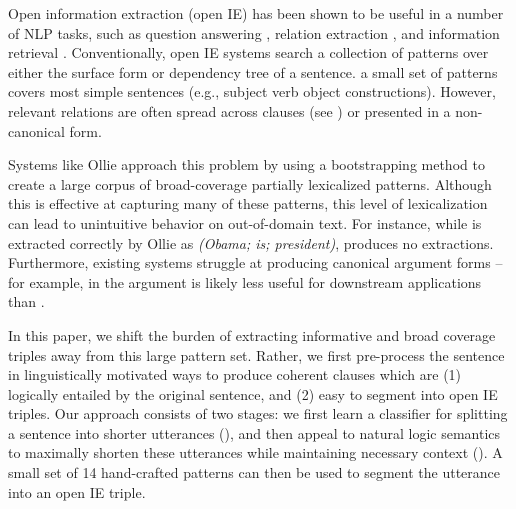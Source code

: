 Open information extraction (open IE) has been shown to be useful in a
  number of NLP tasks, such as question answering \cite{key:2014fader-openqa},
  relation extraction \cite{key:2010soderland-adapting}, 
  and information retrieval \cite{key:2011etzioni-nature}.
Conventionally, open IE systems search a collection of patterns over either
  the surface form or dependency tree of a sentence.
a small set of patterns covers most simple sentences (e.g., subject verb
  object constructions).
However, relevant relations are often spread across clauses (see
  ) or presented in a non-canonical form.

Systems like Ollie \cite{key:2012mausam-ollie} approach this problem by 
  using a bootstrapping method to create a large corpus of broad-coverage
  partially lexicalized patterns.
Although this is effective at capturing many of these patterns,
  this level of lexicalization can lead to unintuitive behavior on 
  out-of-domain text.
For instance, while  is extracted correctly by Ollie
  as \textit{(Obama; is; president)},
   produces no extractions.
Furthermore, existing systems struggle at producing
  canonical argument forms -- for example, in  the argument
   is likely less useful for downstream
  applications than .

In this paper, we shift the burden of extracting informative and broad
  coverage triples away from this large pattern set.
Rather, we first pre-process the sentence in linguistically motivated ways
  to produce coherent clauses which are (1) logically entailed by the 
  original sentence, and (2) easy to segment into open IE triples.
Our approach consists of two stages:
  we first learn a classifier for splitting a sentence into shorter
  utterances (), 
  and then appeal to natural logic semantics to maximally
  shorten these utterances while maintaining necessary context ().
A small set of 14 hand-crafted patterns can then be used to segment the
  utterance into an open IE triple.

